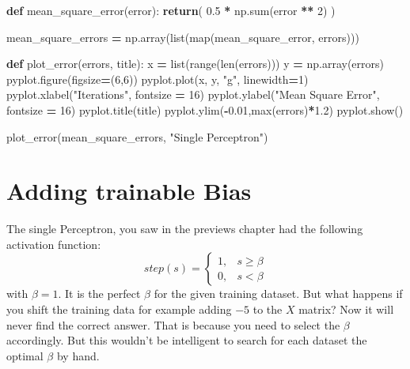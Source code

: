 \documentclass[
]{book}
\newenvironment{Shaded}{\begin{snugshade}}{\end{snugshade}}
\newcommand{\BuiltInTok}[1]{#1}
\newcommand{\ControlFlowTok}[1]{\textcolor[rgb]{0.13,0.29,0.53}{\textbf{#1}}}
\newcommand{\DecValTok}[1]{\textcolor[rgb]{0.00,0.00,0.81}{#1}}
\newcommand{\FloatTok}[1]{\textcolor[rgb]{0.00,0.00,0.81}{#1}}
\newcommand{\KeywordTok}[1]{\textcolor[rgb]{0.13,0.29,0.53}{\textbf{#1}}}
\newcommand{\NormalTok}[1]{#1}
\newcommand{\OperatorTok}[1]{\textcolor[rgb]{0.81,0.36,0.00}{\textbf{#1}}}
\newcommand{\StringTok}[1]{\textcolor[rgb]{0.31,0.60,0.02}{#1}}
\begin{document}
\begin{Shaded}
\begin{Highlighting}[]
  
  
\KeywordTok{def}\NormalTok{ mean\_square\_error(error):}
  \ControlFlowTok{return}\NormalTok{( }\FloatTok{0.5} \OperatorTok{*}\NormalTok{ np.}\BuiltInTok{sum}\NormalTok{(error }\OperatorTok{**} \DecValTok{2}\NormalTok{) )}


\NormalTok{mean\_square\_errors }\OperatorTok{=}\NormalTok{ np.array(}\BuiltInTok{list}\NormalTok{(}\BuiltInTok{map}\NormalTok{(mean\_square\_error, errors)))}


\KeywordTok{def}\NormalTok{ plot\_error(errors, title):}
\NormalTok{  x }\OperatorTok{=} \BuiltInTok{list}\NormalTok{(}\BuiltInTok{range}\NormalTok{(}\BuiltInTok{len}\NormalTok{(errors)))}
\NormalTok{  y }\OperatorTok{=}\NormalTok{ np.array(errors)}
\NormalTok{  pyplot.figure(figsize}\OperatorTok{=}\NormalTok{(}\DecValTok{6}\NormalTok{,}\DecValTok{6}\NormalTok{))}
\NormalTok{  pyplot.plot(x, y, }\StringTok{"g"}\NormalTok{, linewidth}\OperatorTok{=}\DecValTok{1}\NormalTok{)}
\NormalTok{  pyplot.xlabel(}\StringTok{"Iterations"}\NormalTok{, fontsize }\OperatorTok{=} \DecValTok{16}\NormalTok{)}
\NormalTok{  pyplot.ylabel(}\StringTok{"Mean Square Error"}\NormalTok{, fontsize }\OperatorTok{=} \DecValTok{16}\NormalTok{)}
\NormalTok{  pyplot.title(title)}
\NormalTok{  pyplot.ylim(}\OperatorTok{{-}}\FloatTok{0.01}\NormalTok{,}\BuiltInTok{max}\NormalTok{(errors)}\OperatorTok{*}\FloatTok{1.2}\NormalTok{)}
\NormalTok{  pyplot.show()}
  
  
\NormalTok{plot\_error(mean\_square\_errors, }\StringTok{"Single Perceptron"}\NormalTok{)}
\end{Highlighting}
\end{Shaded}

\hypertarget{adding-trainable-bias}{%
\chapter{Adding trainable Bias}\label{adding-trainable-bias}}

The single Perceptron, you saw in the previews chapter had the following activation function:
\[ 
step(s)= 
\begin{cases}
    1,& s   \geq \beta\\
    0,& s < \beta
\end{cases}
\]
with \(\beta = 1\). It is the perfect \(\beta\) for the given training dataset. But what happens if you shift the training data for example adding \(-5\) to the \(X\) matrix? Now it will never find the correct answer. That is because you need to select the \(\beta\) accordingly. But this wouldn't be intelligent to search for each dataset the optimal \(\beta\) by hand.
\end{document}

